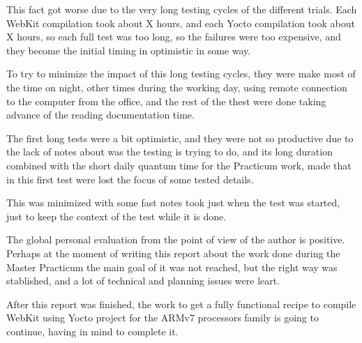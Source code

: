 \documentclass[a4paper,11pt,openany]{report}
\begin{document}
This fact got worse due to the very long testing cycles of the different trials. Each WebKit compilation took about X hours, and each Yocto compilation took about X hours, so each full test was too long, so the failures were too expensive, and they become the initial timing in optimistic in some way.

To try to minimize the impact of this long testing cycles, they were make most of the time on night, other times during the working day, using remote connection to the computer from the office, and the rest of the thest were done taking advance of the reading documentation time.

The first long tests were a bit optimistic, and they were not so productive due to the lack of notes about was the testing is trying to do, and its long duration combined with the short daily quantum time for the Practicum work, made that in this first test were lost the focus of some tested details.

This was minimized with some fast notes took just when the test was started, just to keep the context of the test while it is done.

The global personal evaluation from the point of view of the author is positive. Perhaps at the moment of writing this report about the work done during the Master Practicum the main goal of it was not reached, but the right way was stablished, and a lot of technical and planning issues were leart.

After this report was finished, the work to get a fully functional recipe to compile WebKit using Yocto project for the ARMv7 processors family is going to continue, having in mind to complete it.
\end{document}
